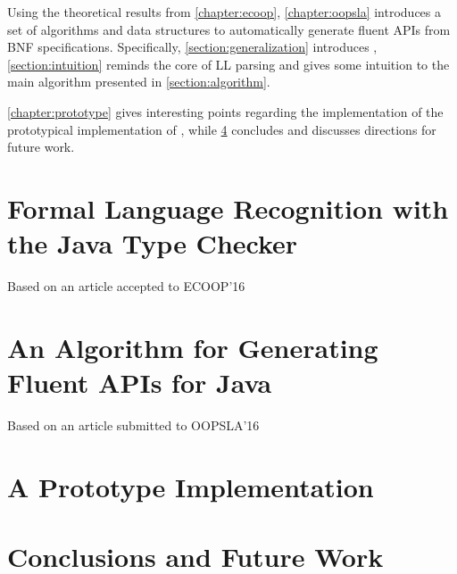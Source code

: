 \documentclass[12pt]{book}
\begin{document}
Using the theoretical results from \cref{chapter:ecoop}, \cref{chapter:oopsla}
  introduces a set of algorithms and data structures to automatically generate
  fluent APIs from BNF specifications. Specifically, \cref{section:generalization}
  introduces \Fajita, \cref{section:intuition} reminds the core of LL parsing and gives
  some intuition to the main algorithm presented in \cref{section:algorithm}.

\cref{chapter:prototype} gives interesting points regarding the implementation
of the prototypical implementation of \Fajita, while \cref{chapter:conclusions}
concludes and discusses directions for future work.

\chapter{Formal Language Recognition with the Java Type Checker}
\Large Based on an article accepted to ECOOP'16~\cite{Gil:Levy:2016}
\label{chapter:ecoop}
\normalsize


\chapter{An Algorithm for Generating Fluent APIs for Java}
\Large Based on an article submitted to OOPSLA'16~\cite{Gil:Levy:2016a}
\label{chapter:oopsla}
\normalsize


\chapter{A Prototype Implementation}
\label{chapter:tokens}
%

\chapter{Conclusions and Future Work}
\label{chapter:conclusions}


\begin{comment} %
\end{comment} %



\end{document}

